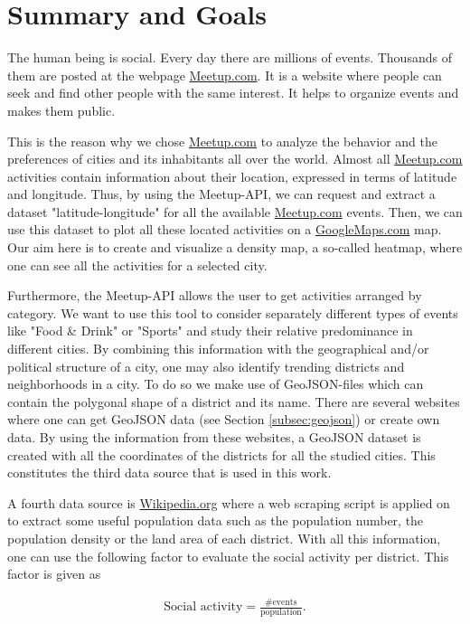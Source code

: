 \section{Summary and Goals}\label{sec:summaryandgoals}

The human being is social. Every day there are millions of events. Thousands of them are posted at the webpage \url{Meetup.com}. It is a website where people can seek and find other people with the same interest. It helps to organize events and makes them public.

This is the reason why we chose \url{Meetup.com} to analyze the behavior and the preferences of cities and its inhabitants all over the world. Almost all \url{Meetup.com} activities contain information about their location, expressed in terms of latitude and longitude. Thus, by using the Meetup-API, we can request and extract a dataset "latitude-longitude" for all the available \url{Meetup.com} events. Then, we can use this dataset to plot all these located activities on a \url{GoogleMaps.com} map. Our aim here is to create and visualize a density map, a so-called heatmap, where one can see all the activities for a selected city.

Furthermore, the Meetup-API allows the user to get activities arranged by category. We want to use this tool to consider separately different types of events like "Food \& Drink" or "Sports" and study their relative predominance in different cities. By combining this information with the geographical and/or political structure of a city, one may also identify trending districts and neighborhoods in a city. To do so we make use of GeoJSON-files which can contain the polygonal shape of a district and its name. There are several websites where one can get GeoJSON data (see Section \ref{subsec:geojson}) or create own data. By using the information from these websites, a GeoJSON dataset is created with all the coordinates of the districts for all the studied cities. This constitutes the third data source that is used in this work.

A fourth data source is \url{Wikipedia.org} where a web scraping script is applied on to extract some useful population data such as the population number, the population density or the land area of each district. With all this information, one can use the following factor to evaluate the social activity per district. This factor is given as

\begin{align*}
	\text{Social activity} = \frac{\text{\# events}}{\text{population}}.
\end{align*}

